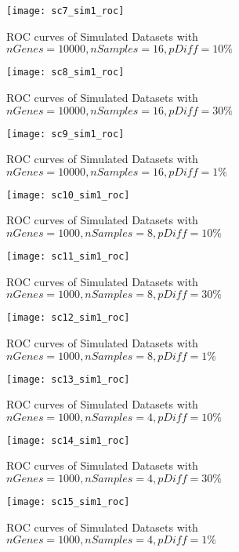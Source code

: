 \begin{figure}[h!tb] 
\texttt{[image: sc7\_sim1\_roc]}
\caption{ROC curves of Simulated Datasets with $nGenes=10000, nSamples=16, pDiff=10\%$}
\label{sc7_roc}
\end{figure}

\begin{figure}[h!tb] 
\texttt{[image: sc8\_sim1\_roc]}
\caption{ROC curves of Simulated Datasets with $nGenes=10000, nSamples=16, pDiff=30\%$}
\label{sc8_roc}
\end{figure}

\begin{figure}[h!tb] 
\texttt{[image: sc9\_sim1\_roc]}
\caption{ROC curves of Simulated Datasets with $nGenes=10000, nSamples=16, pDiff=1\%$}
\label{sc9_roc}
\end{figure}


\begin{figure}[h!tb] 
\texttt{[image: sc10\_sim1\_roc]}
\caption{ROC curves of Simulated Datasets with $nGenes=1000, nSamples=8, pDiff=10\%$}
\label{sc10_roc_01}
\end{figure}




\begin{figure}[h!tb] 
\texttt{[image: sc11\_sim1\_roc]}
\caption{ROC curves of Simulated Datasets with $nGenes=1000, nSamples=8, pDiff=30\%$}
\label{sc11_roc}
\end{figure}

\begin{figure}[h!tb] 
\texttt{[image: sc12\_sim1\_roc]}
\caption{ROC curves of Simulated Datasets with $nGenes=1000, nSamples=8, pDiff=1\%$}
\label{sc12_roc}
\end{figure}


\begin{figure}[h!tb] 
\texttt{[image: sc13\_sim1\_roc]}
\caption{ROC curves of Simulated Datasets with $nGenes=1000, nSamples=4, pDiff=10\%$}
\label{sc13_roc}
\end{figure}


\begin{figure}[h!tb] 
\texttt{[image: sc14\_sim1\_roc]}
\caption{ROC curves of Simulated Datasets with $nGenes=1000, nSamples=4, pDiff=30\%$}
\label{sc14_roc}
\end{figure}


\begin{figure}[h!tb] 
\texttt{[image: sc15\_sim1\_roc]}
\caption{ROC curves of Simulated Datasets with $nGenes=1000, nSamples=4, pDiff=1\%$}
\label{sc15_roc}
\end{figure}

